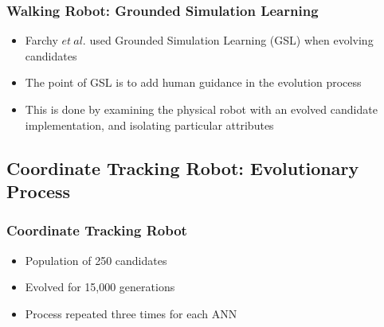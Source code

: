 \documentclass{beamer}
\begin{document}
\begin{frame}
  \frametitle{Walking Robot: Grounded Simulation Learning}
  \begin{itemize}
  \item Farchy $et~al.$ used Grounded Simulation Learning (GSL) when evolving candidates
  \item The point of GSL is to add human guidance in the evolution process
  \item This is done by examining the physical robot with an evolved candidate implementation, and isolating particular attributes
  \end{itemize}
\end{frame}

\subsection{Coordinate Tracking Robot: Evolutionary Process}
\begin{frame}
  \frametitle{Coordinate Tracking Robot}
  \begin{itemize}
   \item Population of 250 candidates
   \item Evolved for 15,000 generations
   \item Process repeated three times for each ANN

  \end{itemize}
\end{frame}
\end{document}
